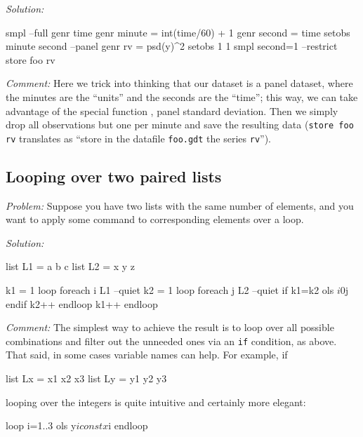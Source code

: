 \emph{Solution:}
\begin{code}
smpl --full
genr time
genr minute = int(time/60) + 1
genr second = time %
setobs minute second --panel
genr rv = psd(y)^2
setobs 1 1
smpl second=1 --restrict
store foo rv
\end{code}

\emph{Comment:} Here we trick  into thinking that our
dataset is a panel dataset, where the minutes are the ``units'' and
the seconds are the ``time''; this way, we can take advantage of the
special function , panel standard deviation.  Then we
simply drop all observations but one per minute and save the resulting
data (\texttt{store foo rv} translates as ``store in the 
datafile \texttt{foo.gdt} the series \texttt{rv}'').

\subsection{Looping over two paired lists}

\emph{Problem:} Suppose you have two lists with the same number of
elements, and you want to apply some command to corresponding elements
over a loop.

\emph{Solution:}
\begin{code}
list L1 = a b c
list L2 = x y z

k1 = 1
loop foreach i L1 --quiet
    k2 = 1
    loop foreach j L2 --quiet
        if k1=k2
            ols $i 0 $j
        endif
        k2++
    endloop
    k1++
endloop
\end{code}

\emph{Comment:} The simplest way to achieve the result is to loop over
all possible combinations and filter out the unneeded ones via an
\texttt{if} condition, as above. That said, in some cases variable
names can help. For example, if
\begin{code}
  list Lx = x1 x2 x3
  list Ly = y1 y2 y3
\end{code}
looping over the integers is quite intuitive and certainly more elegant:
\begin{code}
  loop i=1..3
    ols y$i const x$i
  endloop
\end{code}

